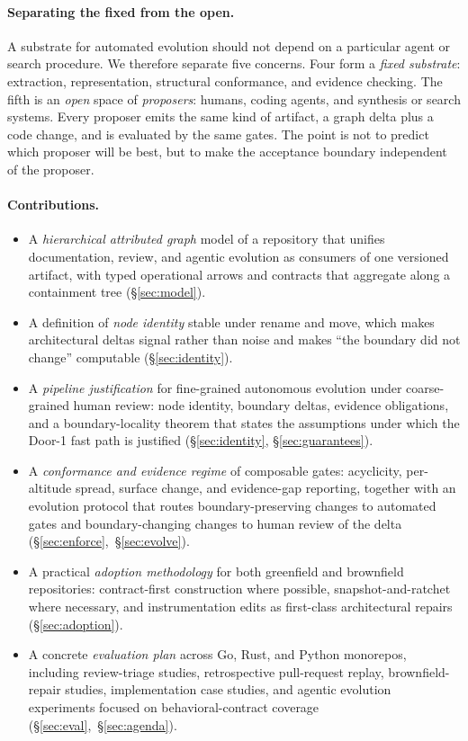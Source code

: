 \documentclass[sigconf,review,anonymous]{acmart}
\theoremstyle{plain}
\theoremstyle{definition}
\begin{document}
\paragraph{Separating the fixed from the open.}
A substrate for automated evolution should not depend on a particular agent or
search procedure. We therefore separate five concerns. Four form a \emph{fixed
substrate}: extraction, representation, structural conformance, and evidence
checking. The fifth is an \emph{open} space of \emph{proposers}: humans, coding
agents, and synthesis or search systems.
Every proposer emits the same kind of artifact, a graph delta plus a code
change, and is evaluated by the same gates. The point is not to predict which
proposer will be best, but to make the acceptance boundary independent of the
proposer.

\paragraph{Contributions.}
\begin{itemize}[leftmargin=1.4em,itemsep=3pt,topsep=2pt]
\item A \emph{hierarchical attributed graph} model of a repository that unifies
documentation, review, and agentic evolution as consumers of one versioned
artifact, with typed operational arrows and contracts that aggregate along a
containment tree (\S\ref{sec:model}).
\item A definition of \emph{node identity} stable under rename and move, which
makes architectural deltas signal rather than noise and makes ``the boundary
did not change'' computable (\S\ref{sec:identity}).
\item A \emph{pipeline justification} for fine-grained autonomous evolution
under coarse-grained human review: node identity, boundary deltas, evidence
obligations, and a boundary-locality theorem that states the assumptions under
which the Door-1 fast path is justified (\S\ref{sec:identity},
\S\ref{sec:guarantees}).
\item A \emph{conformance and evidence regime} of composable gates: acyclicity,
per-altitude spread, surface change, and evidence-gap reporting, together with
an evolution protocol that routes boundary-preserving changes to automated gates
and boundary-changing changes to human review of the delta
(\S\ref{sec:enforce},~\S\ref{sec:evolve}).
\item A practical \emph{adoption methodology} for both greenfield and brownfield
repositories: contract-first construction where possible, snapshot-and-ratchet
where necessary, and instrumentation edits as first-class architectural repairs
(\S\ref{sec:adoption}).
\item A concrete \emph{evaluation plan} across Go, Rust, and Python monorepos,
including review-triage studies, retrospective pull-request replay,
brownfield-repair studies, implementation case studies, and agentic evolution
experiments focused on behavioral-contract coverage
(\S\ref{sec:eval},~\S\ref{sec:agenda}).
\end{itemize}
\end{document}
